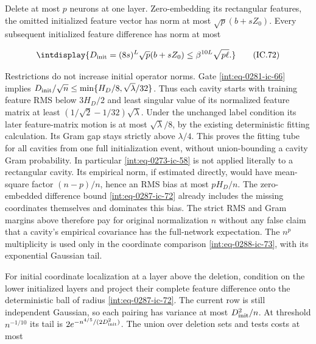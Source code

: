 Delete at most \(p\) neurons at one layer. Zero-embedding its rectangular features, the omitted initialized feature vector has norm at most \(\sqrt p(b+sZ_0)\). Every subsequent initialized feature difference has norm at most


\begingroup\renewcommand{\theHequation}{intdisplay.667}
\begin{equation}
\intdisplay{
D_{\rm init}=(8s)^L\sqrt p(b+sZ_0)
                \le\beta^{10L}\sqrt{p\ell}.
}
\tag{IC.72}
\label{int:eq-0287-ic-72}
\end{equation}
\endgroup


Restrictions do not increase initial operator norms. Gate \eqref{int:eq-0281-ic-66} implies \(D_{\rm init}/\sqrt n\le\min\{H_D/8,\allowbreak \sqrt\lambda/32\}\). Thus each cavity starts with training feature RMS below \(3H_D/2\) and least singular value of its normalized feature matrix at least \((1/\sqrt2-1/32)\sqrt\lambda\). Under the unchanged label condition its later feature-matrix motion is at most \(\sqrt\lambda/8\), by the existing deterministic fitting calculation. Its Gram gap stays strictly above \(\lambda/4\). This proves the fitting tube for all cavities from one full initialization event, without union-bounding a cavity Gram probability. In particular \eqref{int:eq-0273-ic-58} is not applied literally to a rectangular cavity. Its empirical norm, if estimated directly, would have mean-square factor \((n-p)/n\), hence an RMS bias at most \(pH_D/n\). The zero-embedded difference bound \eqref{int:eq-0287-ic-72} already includes the missing coordinates themselves and dominates this bias. The strict RMS and Gram margins above therefore pay for original normalization \(n\) without any false claim that a cavity's empirical covariance has the full-network expectation. The \(n^p\) multiplicity is used only in the coordinate comparison \eqref{int:eq-0288-ic-73}, with its exponential Gaussian tail.



For initial coordinate localization at a layer above the deletion, condition on the lower initialized layers and project their complete feature difference onto the deterministic ball of radius \eqref{int:eq-0287-ic-72}. The current row is still independent Gaussian, so each pairing has variance at most \(D_{\rm init}^2/n\). At threshold \(n^{-1/10}\) its tail is \(2e^{-n^{4/5}/(2D_{\rm init}^2)}\). The union over deletion sets and tests costs at most


